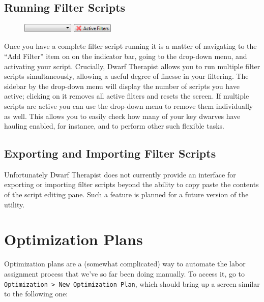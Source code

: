 \documentclass[]{article}
\begin{document}
\newpage
\subsection{Running Filter Scripts}
\label{sec:Running Filter Scripts}
\begin{figure}
  \begin{center}
  \vspace{-20pt}
    \includegraphics[width=0.4\textwidth]{Sec4Fig4+}
  \vspace{-20pt}
  \end{center}
\end{figure}

Once you have a complete filter script running it is a matter of navigating to the ``Add Filter'' item on
on the indicator bar, going to the drop-down menu, and activating your script. Crucially, Dwarf
Therapist allows you to run multiple filter scripts simultaneously, allowing a useful degree of finesse
in your filtering. The sidebar by the drop-down menu will display the number of scripts you have active;
clicking on it removes all active filters and resets the screen. If multiple scripts are active you can
use the drop-down menu to remove them individually as well. This allows you to easily check
how many of your key dwarves have hauling enabled, for instance, and to perform other such flexible
tasks.

\subsection{Exporting and Importing Filter Scripts}
\label{sec:Exporting and Importing Filter Scripts}

Unfortunately Dwarf Therapist does not currently provide an interface for exporting or importing filter
scripts beyond the ability to copy paste the contents of the script editing pane. Such a feature is
planned for a future version of the utility.

\newpage
\section{Optimization Plans}
\label{sec:Optimization Plans}

Optimization plans are a (somewhat complicated) way to automate the labor assignment process that we've
so far been doing manually. To access it, go to \texttt{Optimization > New Optimization Plan}, which
should bring up a screen similar to the following one:
\end{document}
